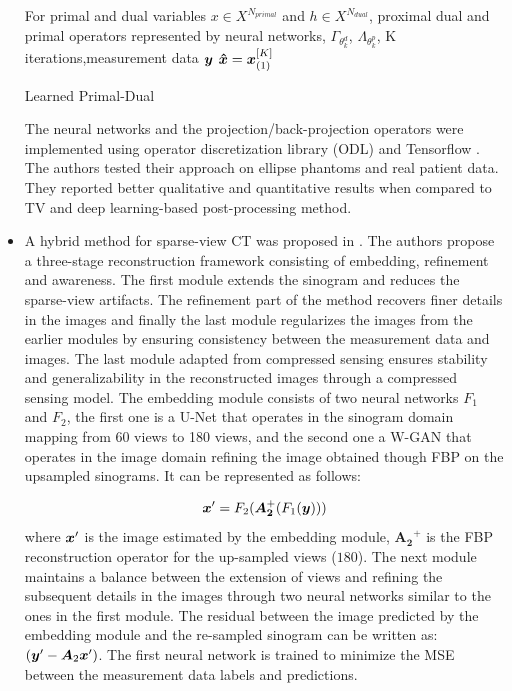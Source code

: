 \begin{itemize}
\begin{algorithm}
	\SetAlgoLined
	For primal and dual variables $x \in X^{N_{primal}}$ and $h \in X^{N_{dual}}$, proximal dual and primal operators represented by neural networks,  $\Gamma_{\theta_{k}^{d}}$, $\Lambda_{\theta_{k}^{p}}$, K iterations,measurement data $\bm{y}$
    \Return $\bm{\hat{x}} = \bm{x}_{(1)}^{[K]}$
	\caption{Learned Primal-Dual}
	\label{alg:pd}
\end{algorithm}

The neural networks and the projection/back-projection operators were implemented using operator discretization library (ODL) and Tensorflow \cite{abadi2016tensorflow}. The authors tested their approach on ellipse phantoms and real patient data. They reported better qualitative and quantitative results when compared to TV and deep learning-based post-processing method. 

\item A hybrid method for sparse-view \ac{CT} was proposed in \cite{wu2021drone}. The authors propose a three-stage reconstruction framework consisting of embedding, refinement and awareness. The first module extends the sinogram and reduces the sparse-view artifacts. The refinement part of the method recovers finer details in the images and finally the last module regularizes the images from the earlier modules by ensuring consistency between the measurement data and images. The last module adapted from compressed sensing ensures stability and generalizability in the reconstructed images through a compressed sensing model. The embedding module consists of two neural networks $F_1$ and $F_2$, the first one is a U-Net that operates in the sinogram domain mapping from 60 views to 180 views, and the second one a W-GAN that operates in the image domain refining the image obtained though \ac{FBP} on the upsampled sinograms. It can be represented as follows:

\begin{equation}
\bm{x}^{\prime}=F_{2}(\bm{A_{2}}^{+}(F_{1} (\bm{y})))
\end{equation}
where $\bm{x}^{\prime}$ is the image estimated by the embedding module, $\bm{A_2}^{+}$ is the \ac{FBP} reconstruction operator for the up-sampled views ($180$). The next module maintains a balance between the extension of views and refining the subsequent details in the images through two neural networks similar to the ones in the first module. The residual between the image predicted by the embedding module and the re-sampled sinogram can be written as: $(\bm{y}'-\bm{A}_{2} \bm{x}')$. The first neural network is trained to minimize the \ac{MSE} between the measurement data labels and predictions.   


\end{itemize}
